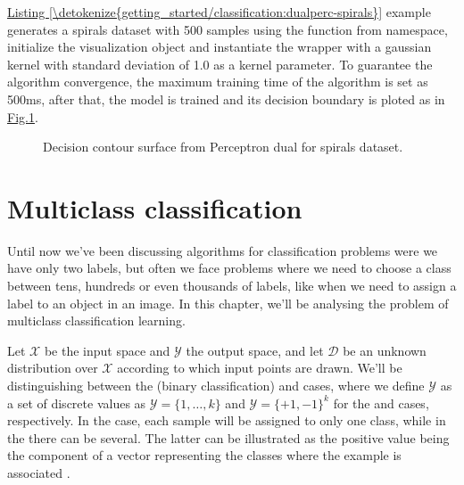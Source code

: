 \documentclass[letterpaper,10pt,english]{sphinxmanual}
\let\sphinxpxdimen\pdfpxdimen\else\newdimen\sphinxpxdimen
\begin{document}
\sphinxAtStartPar
\hyperref[\detokenize{getting_started/classification:dualperc-spirals}]{Listing \ref{\detokenize{getting_started/classification:dualperc-spirals}}} example generates a spirals
dataset with 500 samples using the  function from  namespace, initialize the visualization object and instantiate the 
wrapper with a gaussian kernel with standard deviation of 1.0 as a kernel parameter. To guarantee the algorithm convergence, the maximum training time of the algorithm
is set as 500ms, after that, the model is trained and its decision boundary is ploted as in \hyperref[\detokenize{getting_started/classification:spirals-dualperc-dec}]{Fig.\@ \ref{\detokenize{getting_started/classification:spirals-dualperc-dec}}}.

\begin{figure}[htbp]
\centering
\capstart

\noindent\sphinxincludegraphics[width=450\sphinxpxdimen]{{contour-spirals-percdual}.png}
\caption{Decision contour surface from Perceptron dual for spirals dataset.}\label{\detokenize{getting_started/classification:spirals-dualperc-dec}}\end{figure}


\section{Multi\sphinxhyphen{}class classification}
\label{\detokenize{getting_started/classification:multi-class-classification}}
\sphinxAtStartPar
Until now we’ve been discussing algorithms for classification problems were we have only two labels, but often we face problems where we need
to choose a class between tens, hundreds or even thousands of labels, like when we need to assign a label to an object in an image. In this chapter, we’ll
be analysing the problem of multi\sphinxhyphen{}class classification learning.

\sphinxAtStartPar
Let \(\mathcal{X}\) be the input space and \(\mathcal{Y}\) the output space, and let \(\mathcal{D}\) be an unknown distribution over \(\mathcal{X}\) according
to which input points are drawn. We’ll be distinguishing between the  (binary classification) and  cases, where we define \(\mathcal{Y}\) as a set
of discrete values as \(\mathcal{Y} = \{1, \dots, k\}\) and \(\mathcal{Y} = \{+1, -1\}^{k}\) for the  and  cases, respectively. In the  case,
each sample will be assigned to only one class, while in the  there can be several. The latter can be illustrated as the positive value being the component of a vector
representing the classes where the example is associated .
\end{document}
